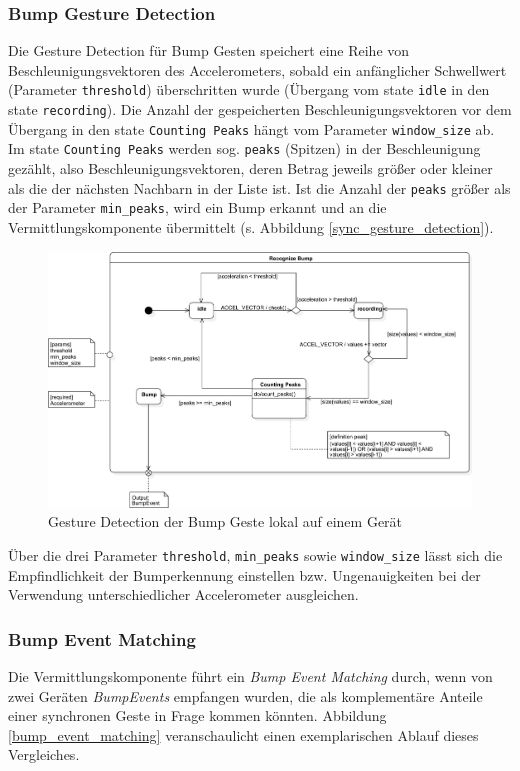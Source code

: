 {\subsubsection*{Bump Gesture Detection}
Die Gesture Detection für Bump Gesten speichert eine Reihe von Beschleunigungsvektoren des Accelerometers, sobald ein anfänglicher Schwellwert (Parameter \texttt{threshold}) überschritten wurde (Übergang vom state \texttt{idle} in den state \texttt{recording}). Die Anzahl der gespeicherten Beschleunigungsvektoren vor dem Übergang in den state \texttt{Counting Peaks} hängt vom Parameter \texttt{win\-dow\_size} ab. Im state \texttt{Counting Peaks} werden sog. \texttt{peaks} (Spitzen) in der Beschleunigung gezählt, also Beschleunigungsvektoren, deren Betrag jeweils größer oder kleiner als die der nächsten Nachbarn in der Liste ist. Ist die Anzahl der \texttt{peaks} größer als der Parameter \texttt{min\_peaks}, wird ein Bump erkannt und an die Vermittlungskomponente übermittelt (s. Abbildung \ref{sync_gesture_detection}).

\begin{figure}[H]
\includegraphics[width=\textwidth]{bump_recognize.png}
\caption{Gesture Detection der Bump Geste lokal auf einem Gerät}
\label{recognize_bump}
\end{figure}

Über die drei Parameter \texttt{threshold}, \texttt{min\_peaks} sowie \texttt{window\_size} lässt sich die Empfindlichkeit der Bumperkennung einstellen bzw. Ungenauigkeiten bei der Verwendung unterschiedlicher Accelerometer ausgleichen.

\subsubsection*{Bump Event Matching}
Die Vermittlungskomponente führt ein \textit{Bump Event Matching} durch, wenn von zwei Geräten \textit{BumpEvents} empfangen wurden, die als komplementäre Anteile einer synchronen Geste in Frage kommen könnten. Abbildung \ref{bump_event_matching} veranschaulicht einen exemplarischen Ablauf dieses Vergleiches.

}
